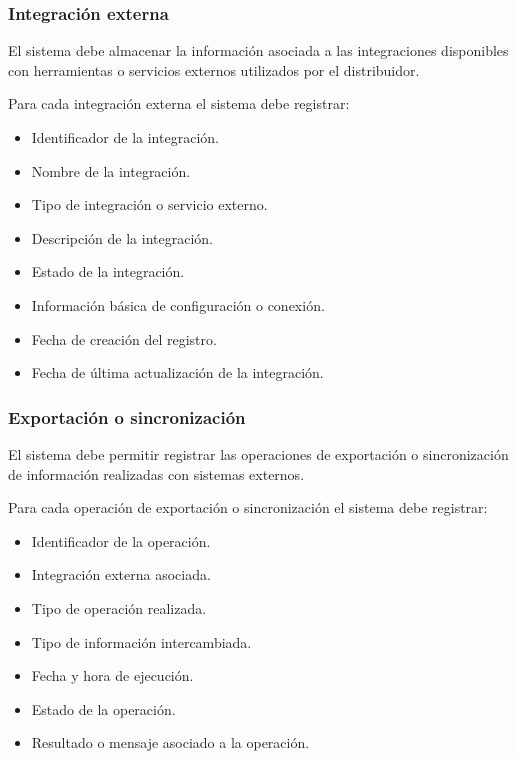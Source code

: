 \subsubsection*{Integración externa}

El sistema debe almacenar la información asociada a las integraciones disponibles con herramientas o servicios externos utilizados por el distribuidor.

Para cada integración externa el sistema debe registrar:

\begin{itemize}
    \item Identificador de la integración.
    \item Nombre de la integración.
    \item Tipo de integración o servicio externo.
    \item Descripción de la integración.
    \item Estado de la integración.
    \item Información básica de configuración o conexión.
    \item Fecha de creación del registro.
    \item Fecha de última actualización de la integración.
\end{itemize}

\subsubsection*{Exportación o sincronización}

El sistema debe permitir registrar las operaciones de exportación o sincronización de información realizadas con sistemas externos.

Para cada operación de exportación o sincronización el sistema debe registrar:

\begin{itemize}
    \item Identificador de la operación.
    \item Integración externa asociada.
    \item Tipo de operación realizada.
    \item Tipo de información intercambiada.
    \item Fecha y hora de ejecución.
    \item Estado de la operación.
    \item Resultado o mensaje asociado a la operación.
\end{itemize}

